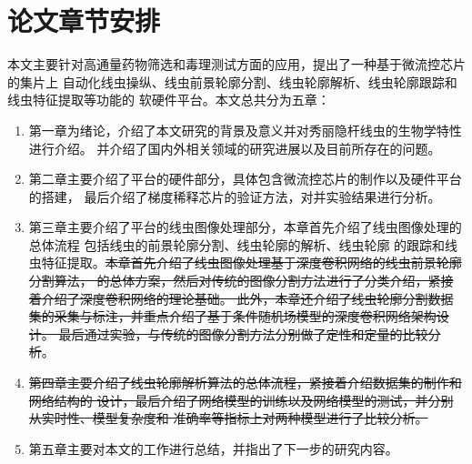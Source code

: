 \section{论文章节安排}
	本文主要针对高通量药物筛选和毒理测试方面的应用，提出了一种基于微流控芯片的集片上
	自动化线虫操纵、线虫前景轮廓分割、线虫轮廓解析、线虫轮廓跟踪和线虫特征提取等功能的
	软硬件平台。本文总共分为五章：
	\begin{enumerate}
	  \item 第一章为绪论，介绍了本文研究的背景及意义并对秀丽隐杆线虫的生物学特性进行介绍。
	  并介绍了国内外相关领域的研究进展以及目前所存在的问题。
	  \item 第二章主要介绍了平台的硬件部分，具体包含微流控芯片的制作以及硬件平台的搭建，
	  最后介绍了梯度稀释芯片的验证方法，对并实验结果进行分析。
	  \item 第三章主要介绍了平台的线虫图像处理部分，本章首先介绍了线虫图像处理的总体流程
	  包括线虫的前景轮廓分割、线虫轮廓的解析、线虫轮廓
	  的跟踪和线虫特征提取。\sout{本章首先介绍了线虫图像处理基于深度卷积网络的线虫前景轮廓分割算法，
	  的总体方案，然后对传统的图像分割方法进行了分类介绍，紧接着介绍了深度卷积网络的理论基础。
	  此外，本章还介绍了线虫轮廓分割数据集的采集与标注，并重点介绍了基于条件随机场模型的深度卷积网络架构设计。
	  最后通过实验，与传统的图像分割方法分别做了定性和定量的比较分析}。
	  \item \sout{第四章主要介绍了线虫轮廓解析算法的总体流程，紧接着介绍数据集的制作和网络结构的
	  设计，最后介绍了网络模型的训练以及网络模型的测试，并分别从实时性、模型复杂度和
	  准确率等指标上对两种模型进行了比较分析。}
	  \item 第五章主要对本文的工作进行总结，并指出了下一步的研究内容。
	\end{enumerate}
\label{sec:intro:org}










